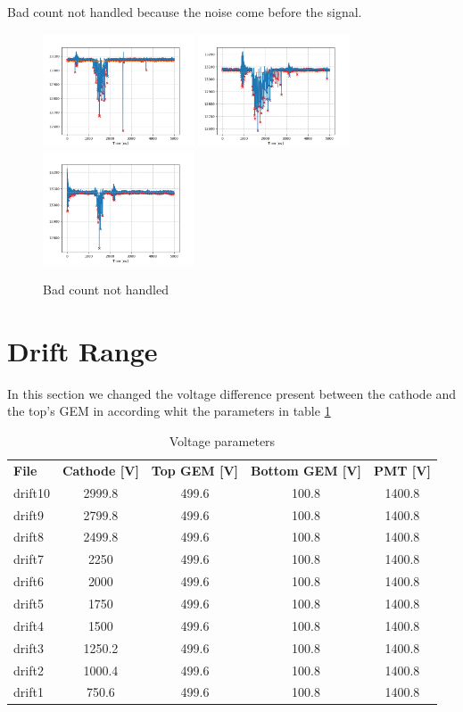 \documentclass[a4paper,twoside,openany]{book}
\begin{document}
Bad count not handled because the noise come before the signal.
\begin{figure}[H]
\centering
\includegraphics[width=0.4\textwidth, height=0.3\textwidth]{Bad_rumore}
\includegraphics[width=0.4\textwidth, height=0.3\textwidth]{Bad_rumore3}
\includegraphics[width=0.4\textwidth, height=0.3\textwidth]{Doppio_bad2}
\caption{Bad count not handled}
\end{figure}

	\section{Drift Range}
In this section we changed the voltage difference present between the cathode and the top's GEM in according whit the parameters in table \ref{driftrange}
\begin{table}[H]
\centering
\begin{tabular}{l|c|c|c|c}\hline
\textbf{File}&\textbf{Cathode [V]}&\textbf{Top GEM [V]}&\textbf{Bottom GEM [V]}&\textbf{PMT [V]}\\
drift10&2999.8&499.6&100.8&1400.8\\\hline
drift9&2799.8&499.6&100.8&1400.8\\\hline
drift8&2499.8&499.6&100.8&1400.8\\\hline
drift7&2250&499.6&100.8&1400.8\\\hline
drift6&2000&499.6&100.8&1400.8\\\hline
drift5&1750&499.6&100.8&1400.8\\\hline
drift4&1500&499.6&100.8&1400.8\\\hline
drift3&1250.2&499.6&100.8&1400.8\\\hline
drift2&1000.4&499.6&100.8&1400.8\\\hline
drift1&750.6&499.6&100.8&1400.8\\\hline
\end{tabular}
\caption{Voltage parameters}
\label{driftrange}
\end{table}
\end{document}
